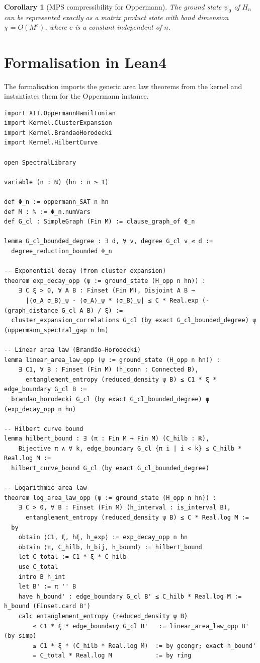 \documentclass[11pt,a4paper]{article}
\newtheorem{corollary}[theorem]{Corollary}
\begin{document}
\begin{corollary}[MPS compressibility for Oppermann]\label{cor:mps}
The ground state $\psi_0$ of $H_n$ can be represented exactly as a matrix product state with bond dimension $\chi = O(M^{c})$, where $c$ is a constant independent of $n$.
\end{corollary}

\section{Formalisation in Lean4}

The formalisation imports the generic area law theorems from the kernel and instantiates them for the Oppermann instance.

\begin{lstlisting}[style=lean, caption={SeriesXII/OppermannAreaLaw.lean (excerpt)}]
import XII.OppermannHamiltonian
import Kernel.ClusterExpansion
import Kernel.BrandaoHorodecki
import Kernel.HilbertCurve

open SpectralLibrary

variable (n : ℕ) (hn : n ≥ 1)

def Φ_n := oppermann_SAT n hn
def M : ℕ := Φ_n.numVars
def G_cl : SimpleGraph (Fin M) := clause_graph_of Φ_n

lemma G_cl_bounded_degree : ∃ d, ∀ v, degree G_cl v ≤ d :=
  degree_reduction_bounded Φ_n

-- Exponential decay (from cluster expansion)
theorem exp_decay_opp (ψ := ground_state (H_opp n hn)) :
    ∃ C ξ > 0, ∀ A B : Finset (Fin M), Disjoint A B →
      |⟨σ_A σ_B⟩_ψ - ⟨σ_A⟩_ψ * ⟨σ_B⟩_ψ| ≤ C * Real.exp (- (graph_distance G_cl A B) / ξ) :=
  cluster_expansion_correlations G_cl (by exact G_cl_bounded_degree) ψ (oppermann_spectral_gap n hn)

-- Linear area law (Brandão–Horodecki)
lemma linear_area_law_opp (ψ := ground_state (H_opp n hn)) :
    ∃ C1, ∀ B : Finset (Fin M) (h_conn : Connected B),
      entanglement_entropy (reduced_density ψ B) ≤ C1 * ξ * edge_boundary G_cl B :=
  brandao_horodecki G_cl (by exact G_cl_bounded_degree) ψ (exp_decay_opp n hn)

-- Hilbert curve bound
lemma hilbert_bound : ∃ (π : Fin M → Fin M) (C_hilb : ℝ),
    Bijective π ∧ ∀ k, edge_boundary G_cl {π i | i < k} ≤ C_hilb * Real.log M :=
  hilbert_curve_bound G_cl (by exact G_cl_bounded_degree)

-- Logarithmic area law
theorem log_area_law_opp (ψ := ground_state (H_opp n hn)) :
    ∃ C > 0, ∀ B : Finset (Fin M) (h_interval : is_interval B),
      entanglement_entropy (reduced_density ψ B) ≤ C * Real.log M :=
  by
    obtain ⟨C1, ξ, hξ, h_exp⟩ := exp_decay_opp n hn
    obtain ⟨π, C_hilb, h_bij, h_bound⟩ := hilbert_bound
    let C_total := C1 * ξ * C_hilb
    use C_total
    intro B h_int
    let B' := π '' B
    have h_bound' : edge_boundary G_cl B' ≤ C_hilb * Real.log M := h_bound (Finset.card B')
    calc entanglement_entropy (reduced_density ψ B)
        ≤ C1 * ξ * edge_boundary G_cl B'   := linear_area_law_opp B' (by simp)
        ≤ C1 * ξ * (C_hilb * Real.log M)  := by gcongr; exact h_bound'
        = C_total * Real.log M            := by ring


\end{lstlisting}
\end{document}
